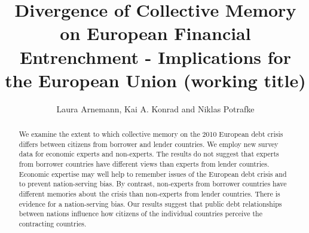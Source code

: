 \documentclass[12pt]{article}
\begin{document}
\title{Divergence of Collective Memory on European Financial Entrenchment -
Implications for the European Union (working title)}
\author{Laura Arnemann, Kai A. Konrad and Niklas Potrafke}
\maketitle

\begin{abstract}
We examine the extent to which collective memory on the 2010 European debt crisis differs between citizens from borrower and lender countries. We employ new survey data for economic experts and non-experts. The results do not suggest that experts from borrower countries have different views than experts from lender countries. Economic expertise may well help to remember issues of the European debt crisis and to prevent nation-serving bias. By contrast, non-experts from borrower countries have different memories about the crisis than non-experts from lender countries. There is evidence for a nation-serving bias. Our results suggest that public debt relationships between nations influence how citizens of the individual countries perceive the contracting countries.
\end{abstract}
\clearpage






%



\clearpage




\clearpage


\end{document}
